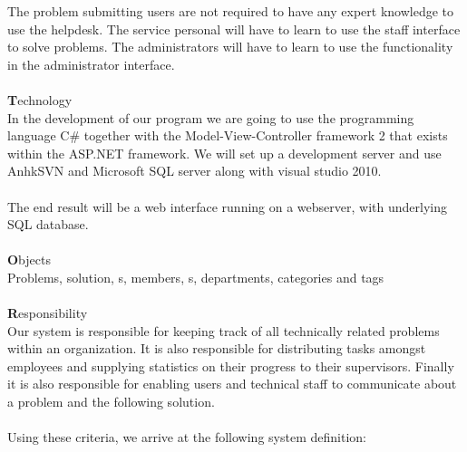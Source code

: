 The problem submitting users are not required to have any expert knowledge to use the helpdesk. The service personal will have to learn to use the staff interface to solve problems. The administrators will have to learn to use the functionality in the administrator interface.   \\
\ \\
{\Large \textbf{T}}echnology \\
In the development of our program we are going to use the programming language C\# together with the Model-View-Controller framework 2 that exists within the ASP.NET framework. We will set up a development server and use AnhkSVN and Microsoft SQL server along with visual studio 2010.\\
\\
The end result will be a web interface running on a webserver, with underlying SQL database.\\
\ \\
{\Large \textbf{O}}bjects \\
Problems, solution, \aclient s, \astaff members, \admin s, departments, categories and tags \\
\ \\
{\Large \textbf{R}}esponsibility \\
Our system is responsible for keeping track of all technically related problems within an organization. It is also responsible for distributing tasks amongst employees and supplying statistics on their progress to their supervisors. Finally it is also responsible for enabling users and technical staff to communicate about a problem and the following solution.\\ 
\ \\
\label{sec:systemdefinition}
Using these criteria, we arrive at the following system definition:

